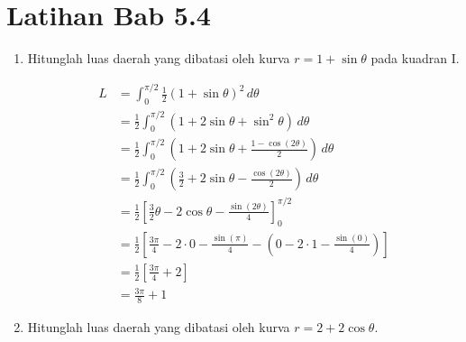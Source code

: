 \documentclass[10pt,openany,a4paper]{article}
\theoremstyle{definition}
\theoremstyle{definition}
\theoremstyle{plain}
\begin{document}
\setlength\fboxsep{3pt}
\setlength{\headheight}{24pt}
\section*{Latihan Bab 5.4}
\begin{enumerate}
    \item Hitunglah luas daerah yang dibatasi oleh kurva $r=1+\sin \theta$ pada kuadran I.
                \begin{center}
            \end{center}
            \allowdisplaybreaks
            \begin{align*}
                L &= \int_0^{\pi/2} \frac{1}{2}(1+\sin \theta)^2 \, d\theta\\
                &= \frac{1}{2} \int_0^{\pi/2} (1 + 2\sin \theta + \sin^2 \theta) \, d\theta\\
                &= \frac{1}{2} \int_0^{\pi/2} \left(1 + 2\sin \theta + \frac{1 - \cos(2\theta)}{2}\right) \, d\theta\\
                &= \frac{1}{2} \int_0^{\pi/2} \left(\frac{3}{2} + 2\sin \theta - \frac{\cos(2\theta)}{2}\right) \, d\theta\\
                &= \frac{1}{2} \left[\frac{3}{2}\theta - 2\cos \theta - \frac{\sin(2\theta)}{4}\right]_0^{\pi/2}\\
                &= \frac{1}{2} \left[\frac{3\pi}{4} - 2\cdot 0 - \frac{\sin(\pi)}{4} - \left(0 - 2\cdot 1 - \frac{\sin(0)}{4}\right)\right]\\
                &= \frac{1}{2} \left[\frac{3\pi}{4} + 2\right]\\
                &= \frac{3\pi}{8} + 1
            \end{align*}
            \item Hitunglah luas daerah yang dibatasi oleh kurva $r=2+2\cos \theta$.
            \begin{center}
                \begin{tikzpicture}

\end{tikzpicture}
\end{center}
\end{enumerate}
\end{document}
